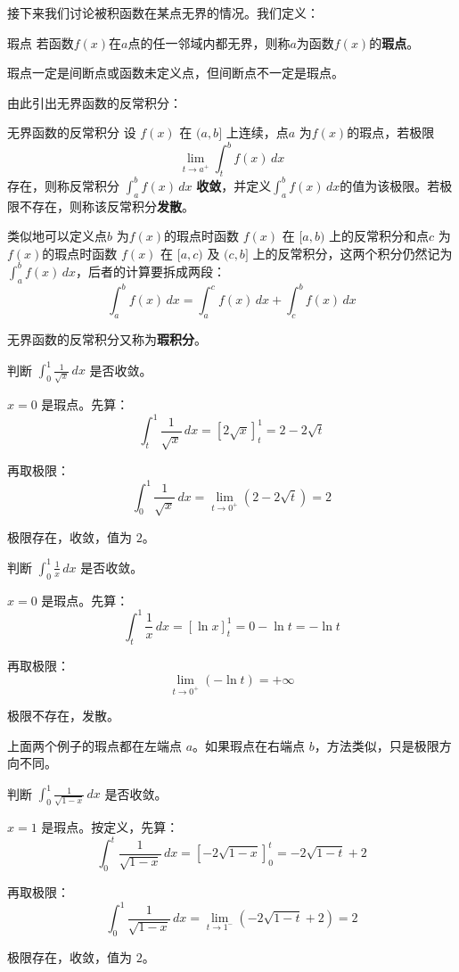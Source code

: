 接下来我们讨论被积函数在某点无界的情况。我们定义：

\begin{definition}{瑕点}{}
  若函数$f(x)$在$a$点的任一邻域内都无界，则称$a$为函数$f(x)$的\textbf{瑕点}。
\end{definition}

瑕点一定是间断点或函数未定义点，但间断点不一定是瑕点。

由此引出无界函数的反常积分：

\begin{definition}{无界函数的反常积分}{}
设 $f(x)$ 在 $(a, b]$ 上连续，点$a$ 为$f(x)$的瑕点，若极限
\[
\lim_{t \to a^+} \int_t^b f(x)\, dx
\]
存在，则称反常积分 $\int_a^b f(x)\, dx$ \textbf{收敛}，并定义$\int_a^b f(x)\, dx$的值为该极限。若极限不存在，则称该反常积分\textbf{发散}。
\end{definition}

类似地可以定义点$b$ 为$f(x)$的瑕点时函数 \(f(x)\) 在 \([a, b)\) 上的反常积分和点$c$ 为$f(x)$的瑕点时函数 \(f(x)\) 在 \([a, c)\) 及 \((c, b]\) 上的反常积分，这两个积分仍然记为 \(\int_a^b f(x) \, dx\)，后者的计算要拆成两段：
\[
\int_a^b f(x) \, dx = \int_a^c f(x) \, dx + \int_c^b f(x) \, dx
\]

无界函数的反常积分又称为\textbf{瑕积分}。

\begin{myexample}
  判断 $\int_0^1 \frac{1}{\sqrt{x}}\, dx$ 是否收敛。

  $x = 0$ 是瑕点。先算：
  \[
  \int_t^1 \frac{1}{\sqrt{x}}\, dx = [2\sqrt{x}]_t^1 = 2 - 2\sqrt{t}
  \]

  再取极限：
  \[
  \int_0^1 \frac{1}{\sqrt{x}}\, dx = \lim_{t \to 0^+} (2 - 2\sqrt{t}) = 2
  \]

  极限存在，收敛，值为 $2$。
\end{myexample}

\begin{myexample}
  判断 $\int_0^1 \frac{1}{x}\, dx$ 是否收敛。

  $x = 0$ 是瑕点。先算：
  \[
  \int_t^1 \frac{1}{x}\, dx = [\ln x]_t^1 = 0 - \ln t = -\ln t
  \]
  
  再取极限：
  \[
  \lim_{t \to 0^+} (-\ln t) = +\infty
  \]
  
  极限不存在，发散。
\end{myexample}

上面两个例子的瑕点都在左端点 $a$。如果瑕点在右端点 $b$，方法类似，只是极限方向不同。

\begin{myexample}
  判断 $\int_0^1 \frac{1}{\sqrt{1-x}}\, dx$ 是否收敛。

  $x = 1$ 是瑕点。按定义，先算：
  \[
  \int_0^t \frac{1}{\sqrt{1-x}}\, dx = [-2\sqrt{1-x}]_0^t = -2\sqrt{1-t} + 2
  \]

  再取极限：
  \[
  \int_0^1 \frac{1}{\sqrt{1-x}}\, dx = \lim_{t \to 1^-} (-2\sqrt{1-t} + 2) = 2
  \]

  极限存在，收敛，值为 $2$。
\end{myexample}

